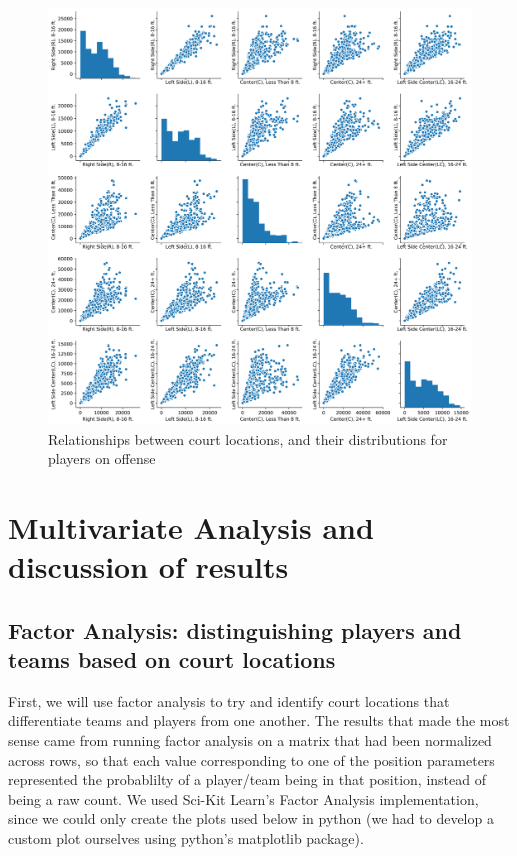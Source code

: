 \documentclass[]{article}
\begin{document}
\begin{figure}
\centering
\includegraphics{player_dist_and_relationships.png}
\caption{Relationships between court locations, and their distributions
for players on offense}
\end{figure}

\hypertarget{multivariate-analysis-and-discussion-of-results}{%
\section{Multivariate Analysis and discussion of
results}\label{multivariate-analysis-and-discussion-of-results}}

\hypertarget{factor-analysis-distinguishing-players-and-teams-based-on-court-locations}{%
\subsection{Factor Analysis: distinguishing players and teams based on
court
locations}\label{factor-analysis-distinguishing-players-and-teams-based-on-court-locations}}

First, we will use factor analysis to try and identify court locations
that differentiate teams and players from one another. The results that
made the most sense came from running factor analysis on a matrix that
had been normalized across rows, so that each value corresponding to one
of the position parameters represented the probablilty of a player/team
being in that position, instead of being a raw count. We used Sci-Kit
Learn's Factor Analysis implementation, since we could only create the
plots used below in python (we had to develop a custom plot ourselves
using python's matplotlib package).
\end{document}
